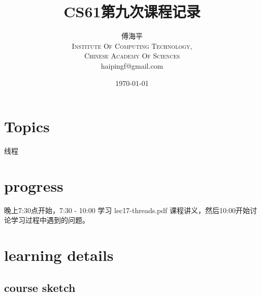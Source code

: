 \documentclass[a4paper, 11pt]{article}
\title{CS61第九次课程记录}
\author{傅海平\\
\textsc{Institute Of Computing Technology,}\\
\textsc{Chinese Academy Of Sciences}\\
haipingf@gmail.com\\
}
\date{\today}
\begin{document}
\maketitle
\newpage
\tableofcontents
\newpage
\section{Topics}
\begin{center}
  \Large{线程}
\end{center}

\section{progress}
晚上7:30点开始，7:30 - 10:00 学习 lec17-threads.pdf 课程讲义，然后10:00开始讨论学习过程中遇到的问题。
\section{learning details}
\subsection{course sketch}
\end{document}
